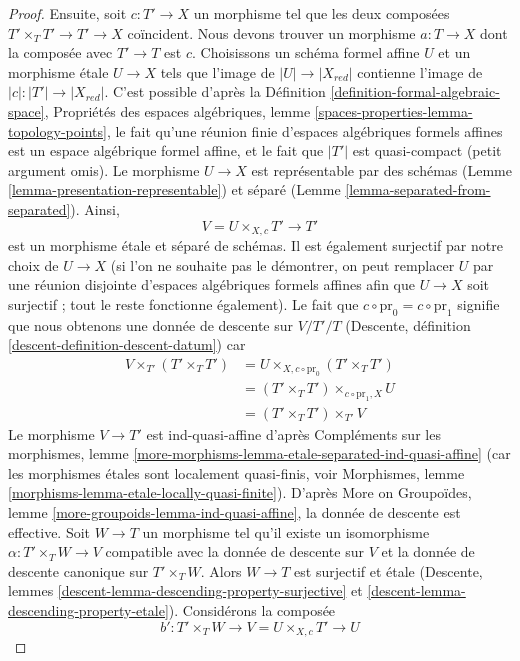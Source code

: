 \begin{proof}
\medskip\noindent
Ensuite, soit $c : T' \to X$ un morphisme tel que les deux composées
$T' \times_T T' \to T' \to X$ coïncident. Nous devons trouver un morphisme
$a : T \to X$ dont la composée avec $T' \to T$ est $c$. Choisissons un
schéma formel affine $U$ et un morphisme \'etale $U \to X$ tels que l'image
de $|U| \to |X_{red}|$ contienne l'image de $|c| : |T'| \to |X_{red}|$.
C'est possible d'après la
Définition \ref{definition-formal-algebraic-space},
Propriétés des espaces algébriques, lemme \ref{spaces-properties-lemma-topology-points},
le fait qu'une réunion finie d'espaces algébriques formels affines est un
espace algébrique formel affine, et le fait que $|T'|$ est quasi-compact
(petit argument omis). Le morphisme $U \to X$ est représentable
par des schémas (Lemme \ref{lemma-presentation-representable}) et
séparé (Lemme \ref{lemma-separated-from-separated}). Ainsi,
$$
V = U \times_{X, c} T' \longrightarrow T'
$$
est un morphisme \'etale et séparé de schémas. Il est également surjectif
par notre choix de $U \to X$ (si l'on ne souhaite pas le démontrer, on peut
remplacer $U$ par une réunion disjointe d'espaces algébriques formels affines afin que
$U \to X$ soit surjectif ; tout le reste fonctionne également). Le fait que
$c \circ \text{pr}_0 = c \circ \text{pr}_1$ signifie que nous obtenons une
donnée de descente sur $V/T'/T$
(Descente, définition \ref{descent-definition-descent-datum})
car
\begin{align*}
V \times_{T'} (T' \times_T T')
& =
U \times_{X, c \circ \text{pr}_0} (T' \times_T T') \\
& =
(T' \times_T T') \times_{c \circ \text{pr}_1, X} U \\
& =
(T' \times_T T') \times_{T'} V
\end{align*}
Le morphisme $V \to T'$ est ind-quasi-affine d'après
Compléments sur les morphismes, lemme
\ref{more-morphisms-lemma-etale-separated-ind-quasi-affine}
(car les morphismes \'etales sont localement quasi-finis, voir
Morphismes, lemme \ref{morphisms-lemma-etale-locally-quasi-finite}).
D'après More on Groupoïdes, lemme \ref{more-groupoids-lemma-ind-quasi-affine},
la donnée de descente est effective. Soit $W \to T$ un morphisme
tel qu'il existe un isomorphisme $\alpha : T' \times_T W \to V$
compatible avec la donnée de descente sur $V$ et la donnée de descente canonique
sur $T' \times_T W$. Alors $W \to T$ est surjectif et \'etale
(Descente, lemmes \ref{descent-lemma-descending-property-surjective} et
\ref{descent-lemma-descending-property-etale}).
Considérons la composée
$$
b' : T' \times_T W \longrightarrow V = U \times_{X, c} T' \longrightarrow U
$$
\end{proof}
